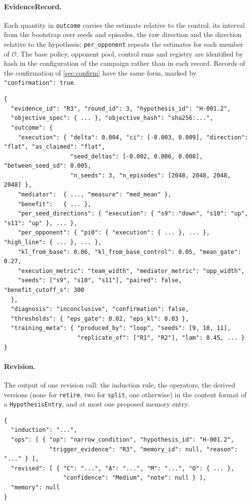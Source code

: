 \documentclass[11pt]{article}
\newcommand{\opp}{\mathcal{O}}           %
\newcommand{\code}[1]{\texttt{\small #1}}
\begin{document}
\paragraph{EvidenceRecord.}
Each quantity in \code{outcome} carries the estimate relative to the control, its interval from the bootstrap over seeds and episodes, the raw direction and the direction relative to the hypothesis; \code{per\_opponent} repeats the estimates for each member of $\opp$.
The base policy, opponent pool, control runs and registry are identified by hash in the configuration of the campaign rather than in each record.
Records of the confirmation of \cref{sec:confirm} have the same form, marked by \code{"confirmation": true}.
\begin{lstlisting}[style=json]
{
  "evidence_id": "R3", "round_id": 3, "hypothesis_id": "H-001.2",
  "objective_spec": { ... }, "objective_hash": "sha256:...",
  "outcome": {
    "execution": { "delta": 0.004, "ci": [-0.003, 0.009], "direction": "flat", "as_claimed": "flat",
                   "seed_deltas": [-0.002, 0.006, 0.008], "between_seed_sd": 0.005,
                   "n_seeds": 3, "n_episodes": [2048, 2048, 2048, 2048] },
    "mediator":  { ..., "measure": "med_mean" },
    "benefit":   { ... },
    "per_seed_directions": { "execution": { "s9": "down", "s10": "up", "s11": "up" }, ... },
    "per_opponent": { "pi0": { "execution": { ... }, ... }, "high_line": { ... }, ... },
    "kl_from_base": 0.06, "kl_from_base_control": 0.05, "mean_gate": 0.27,
    "execution_metric": "team_width", "mediator_metric": "opp_width",
    "seeds": ["s9", "s10", "s11"], "paired": false, "benefit_cutoff_s": 300
  },
  "diagnosis": "inconclusive", "confirmation": false,
  "thresholds": { "eps_gate": 0.02, "eps_kl": 0.03 },
  "training_meta": { "produced_by": "loop", "seeds": [9, 10, 11],
                     "replicate_of": ["R1", "R2"], "lam": 8.45, ... }
}
\end{lstlisting}

\paragraph{Revision.}
The output of one revision call: the induction rule, the operators, the derived versions (none for \code{retire}, two for \code{split}, one otherwise) in the content format of a \code{HypothesisEntry}, and at most one proposed memory entry.
\begin{lstlisting}[style=json]
{
  "induction": "...",
  "ops": [ { "op": "narrow_condition", "hypothesis_id": "H-001.2",
             "trigger_evidence": "R3", "memory_id": null, "reason": "..." } ],
  "revised": [ { "C": "...", "A": "...", "M": "...", "O": { ... },
                 "confidence": "Medium", "note": null } ],
  "memory": null
}
\end{lstlisting}
\end{document}
